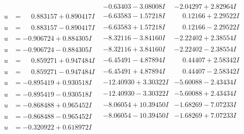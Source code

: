 \documentclass[1p]{elsarticle_modified}
\theoremstyle{definition}
\begin{document}
$$\begin{array}{c|c|c}
 & -0.63403 - 3.08008 I & -2.04297 + 2.82964 I \\ \hline\begin{aligned}
u &= \phantom{-}0.883157 + 0.890417 I\end{aligned}
 & -6.63583 - 1.57218 I & \phantom{-}0.12166 + 2.29522 I \\ \hline\begin{aligned}
u &= \phantom{-}0.883157 - 0.890417 I\end{aligned}
 & -6.63583 + 1.57218 I & \phantom{-}0.12166 - 2.29522 I \\ \hline\begin{aligned}
u &= -0.906724 + 0.884305 I\end{aligned}
 & -8.32116 - 3.84160 I & -2.22402 + 2.38554 I \\ \hline\begin{aligned}
u &= -0.906724 - 0.884305 I\end{aligned}
 & -8.32116 + 3.84160 I & -2.22402 - 2.38554 I \\ \hline\begin{aligned}
u &= \phantom{-}0.859271 + 0.947484 I\end{aligned}
 & -6.45491 - 4.87894 I & \phantom{-}0.44407 + 2.58342 I \\ \hline\begin{aligned}
u &= \phantom{-}0.859271 - 0.947484 I\end{aligned}
 & -6.45491 + 4.87894 I & \phantom{-}0.44407 - 2.58342 I \\ \hline\begin{aligned}
u &= -0.895419 + 0.930518 I\end{aligned}
 & -12.40930 + 3.30322 I & -5.60088 - 2.43434 I \\ \hline\begin{aligned}
u &= -0.895419 - 0.930518 I\end{aligned}
 & -12.40930 - 3.30322 I & -5.60088 + 2.43434 I \\ \hline\begin{aligned}
u &= -0.868488 + 0.965452 I\end{aligned}
 & -8.06054 + 10.39450 I & -1.68269 - 7.07233 I \\ \hline\begin{aligned}
u &= -0.868488 - 0.965452 I\end{aligned}
 & -8.06054 - 10.39450 I & -1.68269 + 7.07233 I \\ \hline\begin{aligned}
u &= -0.320922 + 0.618972 I\end{aligned}

\end{array}$$
\end{document}
